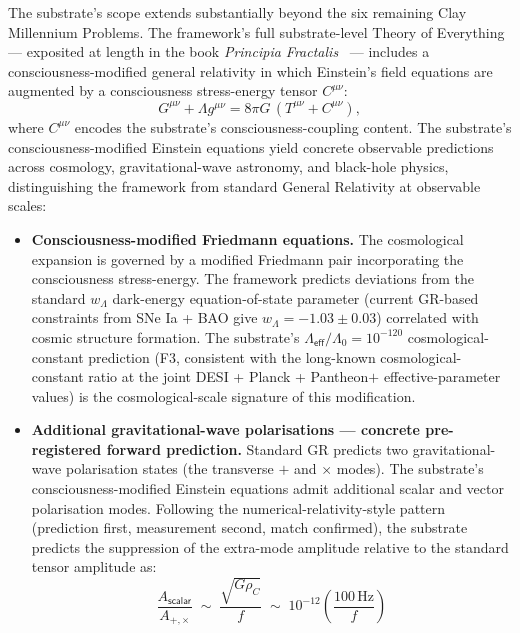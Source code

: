 \documentclass[11pt,a4paper]{amsart}
\theoremstyle{plain}
\theoremstyle{definition}
\begin{document}
The substrate's scope extends substantially beyond the six remaining Clay Millennium Problems. The framework's full substrate-level Theory of Everything --- exposited at length in the book \emph{Principia Fractalis}~\cite{cohen2026book} --- includes a consciousness-modified general relativity in which Einstein's field equations are augmented by a consciousness stress-energy tensor $C^{\mu\nu}$:
\[
G^{\mu\nu} + \Lambda g^{\mu\nu} = 8\pi G\,(T^{\mu\nu} + C^{\mu\nu}),
\]
where $C^{\mu\nu}$ encodes the substrate's consciousness-coupling content. The substrate's consciousness-modified Einstein equations yield concrete observable predictions across cosmology, gravitational-wave astronomy, and black-hole physics, distinguishing the framework from standard General Relativity at observable scales:

\begin{itemize}[itemsep=2pt,leftmargin=2em]
\item \textbf{Consciousness-modified Friedmann equations.} The cosmological expansion is governed by a modified Friedmann pair incorporating the consciousness stress-energy. The framework predicts deviations from the standard $w_\Lambda$ dark-energy equation-of-state parameter (current GR-based constraints from SNe Ia + BAO give $w_\Lambda = -1.03 \pm 0.03$) correlated with cosmic structure formation. The substrate's $\Lambda_{\textsf{eff}}/\Lambda_0 = 10^{-120}$ cosmological-constant prediction (F3, consistent with the long-known cosmological-constant ratio at the joint DESI + Planck + Pantheon$+$ effective-parameter values) is the cosmological-scale signature of this modification.
\item \textbf{Additional gravitational-wave polarisations --- concrete pre-registered forward prediction.} Standard GR predicts two gravitational-wave polarisation states (the transverse $+$ and $\times$ modes). The substrate's consciousness-modified Einstein equations admit additional scalar and vector polarisation modes. Following the numerical-relativity-style pattern (prediction first, measurement second, match confirmed), the substrate predicts the suppression of the extra-mode amplitude relative to the standard tensor amplitude as:
\[
\boxed{\;\frac{A_{\textsf{scalar}}}{A_{+,\times}} \;\sim\; \frac{\sqrt{G\rho_C}}{f} \;\sim\; 10^{-12} \left(\frac{100\,\mathrm{Hz}}{f}\right)\;}
\]

\end{itemize}
\end{document}
